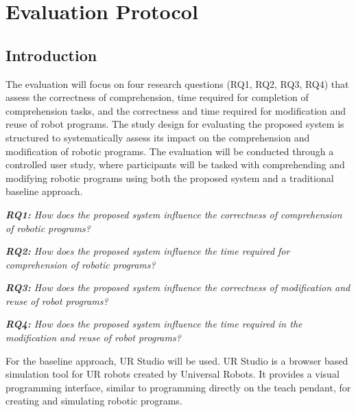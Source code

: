 \chapter{Evaluation Protocol} \label{appendix:evaluation-protocol}

\section{Introduction}
The evaluation will focus on four research questions (RQ1, RQ2, RQ3, RQ4) that assess the correctness of comprehension, time required for completion of comprehension tasks, and the correctness and time required for modification and reuse of robot programs. The study design for evaluating the proposed system is structured to systematically assess its impact on the comprehension and modification of robotic programs. The evaluation will be conducted through a controlled user study, where participants will be tasked with comprehending and modifying robotic programs using both the proposed system and a traditional baseline approach.

\begin{adjustwidth}{\indentWidthTwenty}{\indentWidthTwenty}
    \textit{\textbf{RQ1:} How does the proposed system influence the correctness of comprehension of robotic programs?}
\end{adjustwidth}
\begin{adjustwidth}{\indentWidthTwenty}{\indentWidthTwenty}
    \textit{\textbf{RQ2:} How does the proposed system influence the time required for comprehension of robotic programs?}
\end{adjustwidth}
\begin{adjustwidth}{\indentWidthTwenty}{\indentWidthTwenty}
    \textit{\textbf{RQ3:} How does the proposed system influence the correctness of modification and reuse of robot programs?}
\end{adjustwidth}
\begin{adjustwidth}{\indentWidthTwenty}{\indentWidthTwenty}
    \textit{\textbf{RQ4:} How does the proposed system influence the time required in the modification and reuse of robot programs?}
\end{adjustwidth}

For the baseline approach, UR Studio will be used. UR Studio is a browser based simulation tool for UR robots created by Universal Robots. It provides a visual programming interface, similar to programming directly on the teach pendant, for creating and simulating robotic programs.

